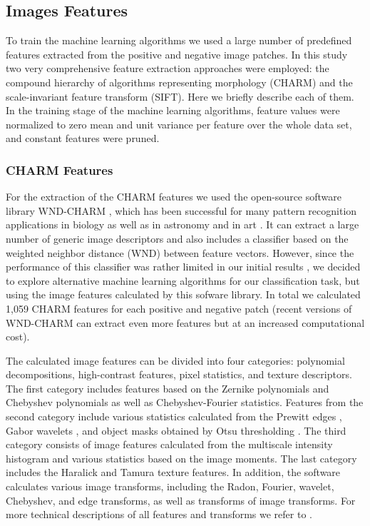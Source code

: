 \subsection{Images Features}
\label{subsec:imageFeaturesExtraction}

To train the machine learning algorithms we used a large number of predefined features extracted from the positive and negative image patches. In this study two very comprehensive feature extraction approaches were employed: the compound hierarchy of algorithms representing morphology (CHARM) and the scale-invariant feature transform (SIFT). Here we briefly describe each of them. {\color{red} In the training stage of the machine learning algorithms, feature values were normalized to zero mean and unit variance per feature over the whole data set, and constant features were pruned.}

\subsubsection{CHARM Features}
\label{subsubsec:wnd-chrm}

For the extraction of the CHARM features we used the open-source software library WND-CHARM \citep{Shamir2008, Orlov2008}, which has been successful for many pattern recognition applications in biology \citep{Shamir-2010, Uhlmann-2016} as well as in astronomy \citep{Shamir-2012, Kuminski-2014} and in art \citep{Shamir-2012b}. It can extract a large number of generic image descriptors and also includes a classifier based on the weighted neighbor distance (WND) between feature vectors. However, since the performance of this classifier was rather limited in our initial results \citep{Mata-2016}, we decided to explore alternative machine learning algorithms for our classification task, but using the image features calculated by this sofware library. In total we calculated 1,059 CHARM features for each positive and negative patch (recent versions of WND-CHARM can extract even more features but at an increased computational cost).

The calculated image features can be divided into four categories: polynomial decompositions, high-contrast features, pixel statistics, and texture descriptors. The first category includes features based on the Zernike polynomials and Chebyshev polynomials \citep{Gradshtein1994} as well as Chebyshev-Fourier statistics. Features from the second category include various statistics calculated from the Prewitt edges \citep{Prewitt1970}, Gabor wavelets \citep{Gabor1946}, and object masks obtained by Otsu thresholding \citep{Otsu1979}. The third category consists of image features calculated from the multiscale intensity histogram \citep{Hadjidementriou2001} and various statistics based on the image moments. The last category includes the Haralick \citep{Haralick-1975} and Tamura \citep{Tamura1978} texture features. In addition, the software calculates various image transforms, including the Radon, Fourier, wavelet, Chebyshev, and edge transforms, as well as transforms of image transforms. For more technical descriptions of all features and transforms we refer to \cite{Orlov2008}.

